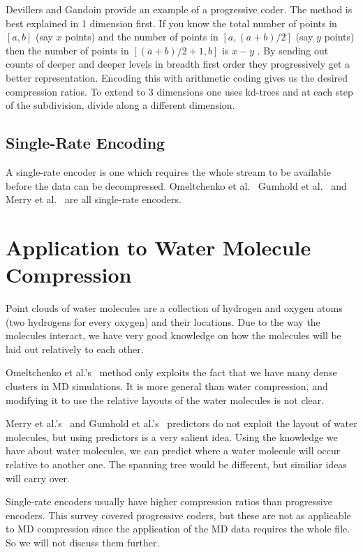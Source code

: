 \documentclass[11pt,twocolumn]{article}
\begin{document}
Devillers and Gandoin \cite{devillers2000gci} provide an example of a
progressive coder. The method is best explained in 1 dimension first. If you
know the total number of points in $[a, b]$ (say $x$ points) and the number of
points in $[a, (a+b)/2]$ (say $y$ points) then the number of points in
$[(a+b)/2+1, b]$ is $x - y$ . By sending out counts of deeper and deeper
levels in breadth first order they progressively get a better
representation. Encoding this with arithmetic coding gives us the desired
compression ratios. To extend to 3 dimensions one uses kd-trees and at each
step of the subdivision, divide along a different dimension.


\subsection{Single-Rate Encoding}

A single-rate encoder is one which requires the whole stream to be available
before the data can be decompressed. Omeltchenko et
al.~\cite{omeltchenko2000sls} Gumhold et al.~\cite{gumholdcomp} and Merry et
al.~\cite{merrycomp} are all single-rate encoders.


\section{Application to Water Molecule Compression}

Point clouds of water molecules are a collection of hydrogen and oxygen atoms
(two hydrogens for every oxygen) and their locations. Due to the way the
molecules interact, we have very good knowledge on how the molecules will be
laid out relatively to each other.

Omeltchenko et al.'s~\cite{omeltchenko2000sls} method only exploits the fact
that we have many dense clusters in MD simulations. It is more general than
water compression, and modifying it to use the relative layouts of the water
molecules is not clear.

Merry et al.'s~\cite{merrycomp} and Gumhold et al.'s~\cite{gumholdcomp}
predictors do not exploit the layout of water molecules, but using predictors
is a very salient idea. Using the knowledge we have about water molecules, we
can predict where a water molecule will occur relative to another one. The
spanning tree would be different, but similiar ideas will carry over.

Single-rate encoders usually have higher compression ratios than progressive
encoders. This survey covered progressive coders, but these are not as
applicable to MD compression since the application of the MD data requires the
whole file. So we will not discuss them further.
\end{document}
